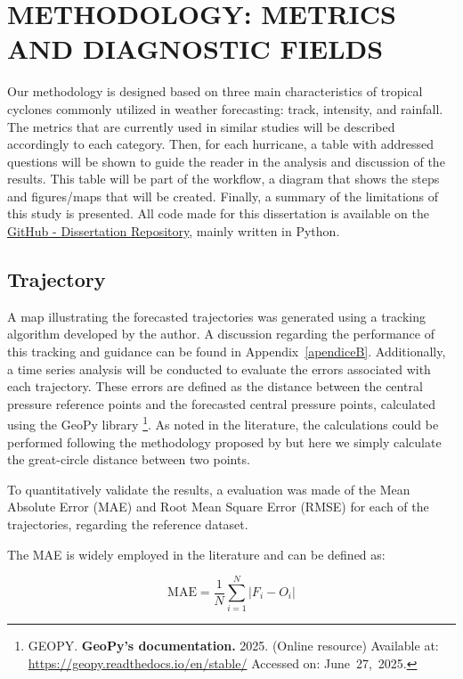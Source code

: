 \chapter{METHODOLOGY: METRICS AND DIAGNOSTIC FIELDS}
\label{ch:methods}

Our methodology is designed based on three main characteristics of tropical cyclones commonly utilized in weather forecasting: track, intensity, and rainfall. The metrics that are currently used in similar studies will be described accordingly to each category. Then, for each hurricane, a table with addressed questions will be shown to guide the reader in the analysis and discussion of the results. This table will be part of the workflow, a diagram that shows the steps and figures/maps that will be created. Finally, a summary of the limitations of this study is presented. All code made for this dissertation is available on the
\href{https://github.com/biancafusi/Dissertation}{GitHub - Dissertation Repository}, mainly written in Python.

\section{Trajectory}

A map illustrating the forecasted trajectories was generated using a tracking algorithm developed by the author. A discussion regarding the performance of this tracking and guidance can be found in Appendix~\ref{apendiceB}. Additionally, a time series analysis will be conducted to evaluate the errors associated with each trajectory. These errors are defined as the distance between the central pressure reference points and the forecasted central pressure points, calculated using the GeoPy library \footnote{GEOPY. \textbf{GeoPy's documentation.} 2025. (Online resource) Available at: \url{https://geopy.readthedocs.io/en/stable/} Accessed on: June 27, 2025.}. As noted in the literature, the calculations could be performed following the methodology proposed by  but here we simply calculate the great-circle distance between two points. 

To quantitatively validate the results, a evaluation was made of the Mean Absolute Error (MAE) and Root Mean Square Error (RMSE) for each of the trajectories, regarding the reference dataset.

The MAE is widely employed \cite{ditchek2023improving, nyongesa2024influence} in the literature and can be defined as:

\begin{equation}
    \text{MAE} = \frac{1}{N}\sum_{i=1}^{N} |F_i -O_i|
\end{equation}

